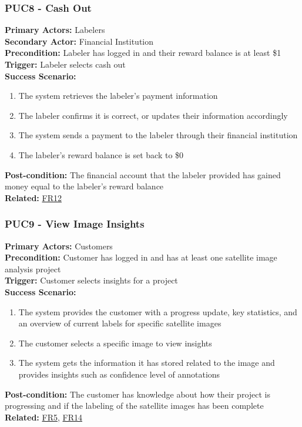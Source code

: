 \documentclass[12pt]{article}
\begin{document}
\subsubsection*{PUC8 - Cash Out}
\label{sec:PUC8}
\textbf{Primary Actors:} Labelers\\
\textbf{Secondary Actor:} Financial Institution\\
\textbf{Precondition:} Labeler has logged in and their reward balance is at least \$1\\
\textbf{Trigger:} Labeler selects cash out\\
\textbf{Success Scenario:}
\begin{enumerate}
    \item The system retrieves the labeler's payment information
    \item The labeler confirms it is correct, or updates their information accordingly
    \item The system sends a payment to the labeler through their financial institution
    \item The labeler's reward balance is set back to \$0
\end{enumerate}
\textbf{Post-condition:} The financial account that the labeler provided has gained money equal to the labeler's reward balance\\
\textbf{Related:} \hyperref[sec:FR12]{FR12}

\subsubsection*{PUC9 - View Image Insights}
\label{sec:PUC9}
\textbf{Primary Actors:} Customers\\
\textbf{Precondition:} Customer has logged in and has at least one satellite image analysis project\\
\textbf{Trigger:} Customer selects insights for a project\\
\textbf{Success Scenario:}
\begin{enumerate}
    \item The system provides the customer with a progress update, key statistics, and an overview of current labels for specific satellite images
    \item The customer selects a specific image to view insights 
    \item The system gets the information it has stored related to the image and provides insights such as confidence level of annotations
\end{enumerate}
\textbf{Post-condition:} The customer has knowledge about how their project is progressing and if the labeling of the satellite images has been complete\\
\textbf{Related:} \hyperref[sec:FR5]{FR5}, \hyperref[sec:FR14]{FR14}
\end{document}
